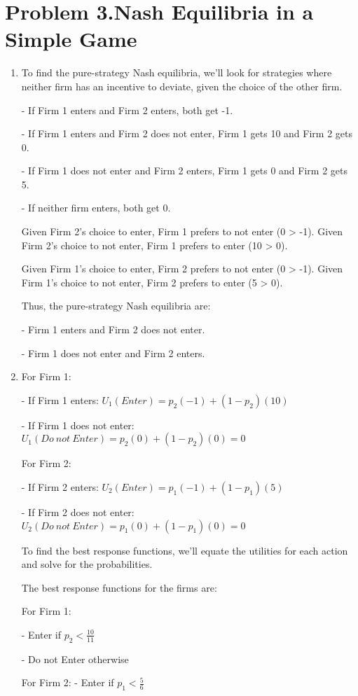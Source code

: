 \documentclass[UTF8,titlepage]{article}
\numberwithin{figure}{section}
\begin{document}
\section{Problem 3.Nash Equilibria in a Simple Game}
\begin{enumerate}
\item To find the pure-strategy Nash equilibria, we'll look for strategies where neither firm has an incentive to deviate, given the choice of the other firm.

- If Firm 1 enters and Firm 2 enters, both get -1.

- If Firm 1 enters and Firm 2 does not enter, Firm 1 gets 10 and Firm 2 gets 0.

- If Firm 1 does not enter and Firm 2 enters, Firm 1 gets 0 and Firm 2 gets 5.

- If neither firm enters, both get 0.

Given Firm 2's choice to enter, Firm 1 prefers to not enter (0 > -1). Given Firm 2's choice to not enter, Firm 1 prefers to enter (10 > 0).

Given Firm 1's choice to enter, Firm 2 prefers to not enter (0 > -1). Given Firm 1's choice to not enter, Firm 2 prefers to enter (5 > 0).

Thus, the pure-strategy Nash equilibria are:

- Firm 1 enters and Firm 2 does not enter.

- Firm 1 does not enter and Firm 2 enters.

\item For Firm 1:

- If Firm 1 enters: \( U_1(Enter) = p_2(-1) + (1-p_2)(10) \)

- If Firm 1 does not enter: \( U_1(Do \ not \ Enter) = p_2(0) + (1-p_2)(0) = 0 \)

For Firm 2:

- If Firm 2 enters: \( U_2(Enter) = p_1(-1) + (1-p_1)(5) \)

- If Firm 2 does not enter: \( U_2(Do \ not \ Enter) = p_1(0) + (1-p_1)(0) = 0 \)

To find the best response functions, we'll equate the utilities for each action and solve for the probabilities.

The best response functions for the firms are:

For Firm 1:

- Enter if \( p_2 < \frac{10}{11} \)

- Do not Enter otherwise

For Firm 2:
- Enter if \( p_1 < \frac{5}{6} \)


\end{enumerate}
\end{document}
